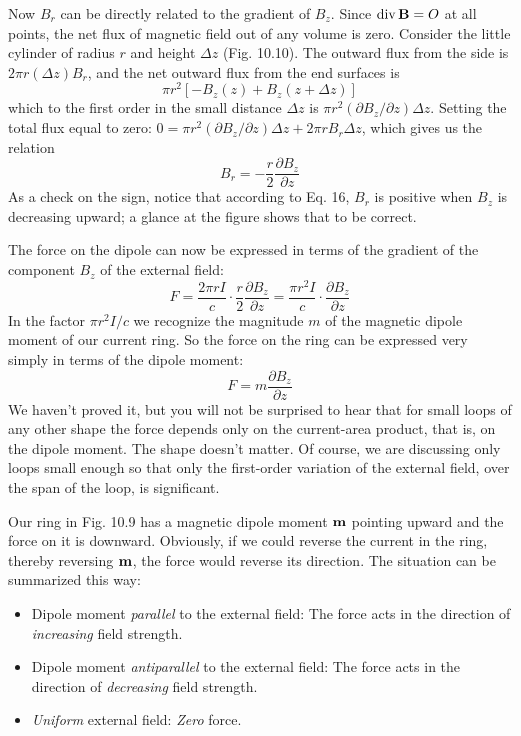 Now $B_r$ can be directly related to the gradient of $B_z$. Since
$\operatorname{div}\mathbf{B} = O$ at all points, the net flux of magnetic field out of any
volume is zero. Consider the little cylinder of radius $r$ and height $\Delta z$
(Fig. 10.10). The outward flux from the side is $2\pi r(\Delta z)B_r$, and the
net outward flux from the end surfaces is 
\begin{equation}
  \pi r^2[-B_z(z)+B_z(z+\Delta z)]
\end{equation}
which to the first order in the small distance $\Delta z$ is $\pi r^2(\partial B_z/\partial z)\Delta z$.
Setting the total flux equal to zero:
$0 = \pi r^2(\partial B_z/\partial z)\Delta z+2\pi r B_r \Delta z$,
which gives us the relation
\begin{equation}
  B_r = -\frac{r}{2} \frac{\partial B_z}{\partial z}
\end{equation}
As a check on the sign, notice that according to Eq. 16, $B_r$ is positive
when $B_z$ is decreasing upward; a glance at the figure shows that to
be correct.

The force on the dipole can now be expressed in terms of the
gradient of the component $B_z$ of the external field:
\begin{equation}
  F = \frac{2\pi rI}{c}\cdot\frac{r}{2} \frac{\partial B_z}{\partial z}
    = \frac{\pi r^2 I}{c}\cdot \frac{\partial B_z}{\partial z}
\end{equation}
In the factor $\pi r^2 I/c$ we recognize the magnitude $m$ of the magnetic
dipole moment of our current ring. So the force on the ring can be
expressed very simply in terms of the dipole moment:
\begin{equation}
  F = m \frac{\partial B_z}{\partial z}
\end{equation}
We haven't proved it, but you will not be surprised to hear that for
small loops of any other shape the force depends only on the 
current-area product, that is, on the dipole moment. The shape doesn't
matter. Of course, we are discussing only loops small enough so
that only the first-order variation of the external field, over the span
of the loop, is significant.

Our ring in Fig. 10.9 has a magnetic dipole moment $\mathbf{m}$ pointing
upward and the force on it is downward. Obviously, if we could
reverse the current in the ring, thereby reversing $\mathbf{m}$, the force would
reverse its direction. The situation can be summarized this way:

\begin{itemize}
\item Dipole moment \emph{parallel} to the external field: The force acts in the direction
of \emph{increasing} field strength.

\item Dipole moment \emph{antiparallel} to the external field: The force acts in the
direction of \emph{decreasing} field strength.

\item \emph{Uniform} external field: \emph{Zero} force.
\end{itemize}

